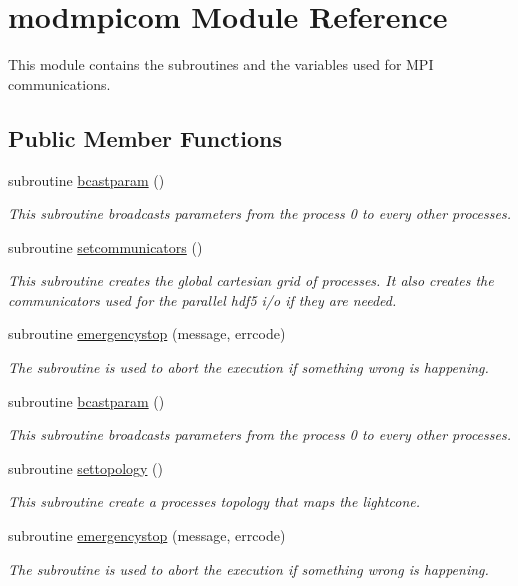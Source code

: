 \hypertarget{classmodmpicom}{\section{modmpicom Module Reference}
\label{classmodmpicom}
}


This module contains the subroutines and the variables used for M\-P\-I communications.  


\subsection*{Public Member Functions}
\begin{DoxyCompactItemize}
\item 
subroutine \hyperlink{classmodmpicom_a21d58237b17806c7fb966b1393227530}{bcastparam} ()
\begin{DoxyCompactList}\small\item\em This subroutine broadcasts parameters from the process 0 to every other processes. \end{DoxyCompactList}\item 
subroutine \hyperlink{classmodmpicom_a95ff384e42736ca3e2ccef78d7d8554a}{setcommunicators} ()
\begin{DoxyCompactList}\small\item\em This subroutine creates the global cartesian grid of processes. It also creates the communicators used for the parallel hdf5 i/o if they are needed. \end{DoxyCompactList}\item 
subroutine \hyperlink{classmodmpicom_a75a2de7a16fce78b94bd79731a2fbd81}{emergencystop} (message, errcode)
\begin{DoxyCompactList}\small\item\em The subroutine is used to abort the execution if something wrong is happening. \end{DoxyCompactList}\item 
subroutine \hyperlink{classmodmpicom_a21d58237b17806c7fb966b1393227530}{bcastparam} ()
\begin{DoxyCompactList}\small\item\em This subroutine broadcasts parameters from the process 0 to every other processes. \end{DoxyCompactList}\item 
subroutine \hyperlink{classmodmpicom_a158a13b594a854025da3c47f32a493de}{settopology} ()
\begin{DoxyCompactList}\small\item\em This subroutine create a processes topology that maps the lightcone. \end{DoxyCompactList}\item 
subroutine \hyperlink{classmodmpicom_a75a2de7a16fce78b94bd79731a2fbd81}{emergencystop} (message, errcode)
\begin{DoxyCompactList}\small\item\em The subroutine is used to abort the execution if something wrong is happening. \end{DoxyCompactList}\end{DoxyCompactItemize}

